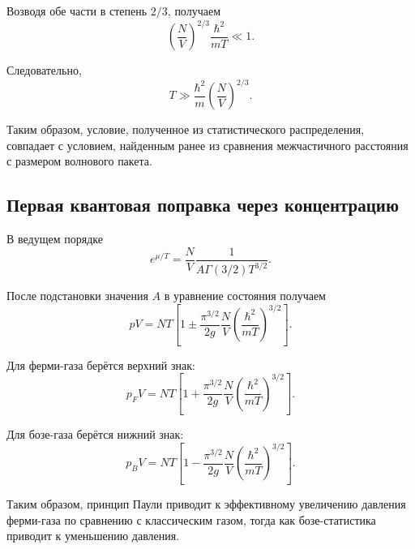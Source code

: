 \documentclass[../final.tex]{subfiles}
\begin{document}
Возводя обе части в степень $2/3$, получаем
%
\begin{equation*}
    \left(
        \frac{N}{V}
    \right)^{2/3}
    \frac{\hbar^2}{mT}
    \ll
    1.
\end{equation*}

Следовательно,
%
\[
    \boxed{
        T
        \gg
        \frac{\hbar^2}{m}
        \left(
            \frac{N}{V}
        \right)^{2/3}
    }.
\]

Таким образом, условие, полученное из статистического распределения,
совпадает с условием, найденным ранее из сравнения межчастичного
расстояния с размером волнового пакета.


\subsection{Первая квантовая поправка через концентрацию}

В ведущем порядке
%
\begin{equation*}
    e^{\mu/T}
    =
    \frac{N}{V}
    \frac{1}{
        A
        \Gamma(3/2)
        T^{3/2}
    }.
\end{equation*}

После подстановки значения $A$ в уравнение состояния получаем
%
\[
    \boxed{
        pV
        =
        NT
        \left[
            1
            \pm
            \frac{\pi^{3/2}}{2g}
            \frac{N}{V}
            \left(
                \frac{\hbar^2}{mT}
            \right)^{3/2}
        \right]
    }.
\]

Для ферми-газа берётся верхний знак:
%
\begin{equation*}
    p_F V
    =
    NT
    \left[
        1
        +
        \frac{\pi^{3/2}}{2g}
        \frac{N}{V}
        \left(
            \frac{\hbar^2}{mT}
        \right)^{3/2}
    \right].
\end{equation*}

Для бозе-газа берётся нижний знак:
%
\begin{equation*}
    p_B V
    =
    NT
    \left[
        1
        -
        \frac{\pi^{3/2}}{2g}
        \frac{N}{V}
        \left(
            \frac{\hbar^2}{mT}
        \right)^{3/2}
    \right].
\end{equation*}

Таким образом, принцип Паули приводит к эффективному увеличению
давления ферми-газа по сравнению с классическим газом, тогда как
бозе-статистика приводит к уменьшению давления.
\end{document}
